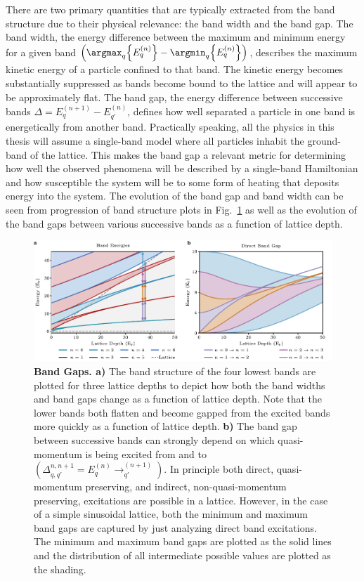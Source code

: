There are two primary quantities that are typically extracted from the band structure due to their physical relevance: the band width and the band gap. The band width, the energy difference between the maximum and minimum energy for a given band $\left ( \argmax_q {\left \{ E_q^{(n)} \right \}}- \argmin_q { \left \{ E_q^{(n)} \right \} } \right)$, describes the maximum kinetic energy of a particle confined to that band. The kinetic energy becomes substantially suppressed as bands become bound to the lattice and will appear to be approximately flat. The band gap, the energy difference between successive bands $\Delta = E_q^{(n+1)} - E_{q'}^{(n)} $, defines how well separated a particle in one band is energetically from another band. Practically speaking, all the physics in this thesis will assume a single-band model where all particles inhabit the ground-band of the lattice. This makes the band gap a relevant metric for determining how well the observed phenomena will be described by a single-band Hamiltonian and how susceptible the system will be to some form of heating that deposits energy into the system. The evolution of the band gap and band width can be seen from progression of band structure plots in Fig.~\ref{fig:bandGaps} as well as the evolution of the band gaps between various successive bands as a function of lattice depth.

\begin{figure}[t!]
		\includegraphics[width=\columnwidth]{figures/ch1/BandStructure/BSScaleV2_edit.pdf} 
		\caption{\textbf{Band Gaps. a)} The band structure of the four lowest bands are plotted for three lattice depths to depict how both the band widths and band gaps change as a function of lattice depth. Note that the lower bands both flatten and become gapped from the excited bands more quickly as a function of lattice depth. \textbf{b)} The band gap between successive bands can strongly depend on which quasi-momentum is being excited from and to $\left ( \Delta_{q,q'}^{n,n+1}=E_q^{(n)}\rightarrow_{q'}^{(n+1)} \right )$. In principle both direct, quasi-momentum preserving, and indirect, non-quasi-momentum preserving, excitations are possible in a lattice. However, in the case of a simple sinusoidal lattice, both the minimum and maximum band gaps are captured by just analyzing direct band excitations. The minimum and maximum band gaps are plotted as the solid lines and the distribution of all intermediate possible values are plotted as the shading.}
		\label{fig:bandGaps}	
\end{figure}


